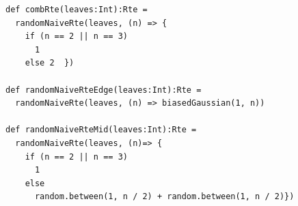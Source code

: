 \begin{lstlisting}[style=scalaioScala]
def combRte(leaves:Int):Rte =
  randomNaiveRte(leaves, (n) => {
    if (n == 2 || n == 3)
      1
    else 2  })

def randomNaiveRteEdge(leaves:Int):Rte =
  randomNaiveRte(leaves, (n) => biasedGaussian(1, n))

def randomNaiveRteMid(leaves:Int):Rte =
  randomNaiveRte(leaves, (n)=> {
    if (n == 2 || n == 3)
      1
    else
      random.between(1, n / 2) + random.between(1, n / 2)})
\end{lstlisting}
